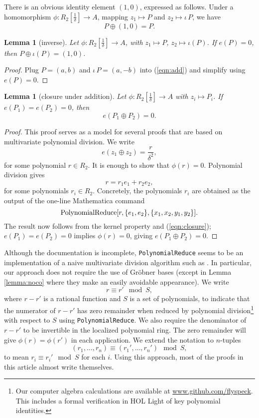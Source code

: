 \documentclass[12pt]{article}
\newtheorem{lemma}[theorem]{Lemma}
\newcommand{\op}[1]{\hbox{#1}}
\newcommand{\f}[1]{\frac{1}{#1}}
\begin{document}
There is an obvious identity element $(1,0)$, expressed as follows.
Under a homomorphism $\phi:R_2[\f{\delta}]\to A$, mapping $z_1\mapsto
P$ and $z_2\mapsto \iota\,P$, we have
\begin{equation}
P\oplus(1,0) = P.
\end{equation}

\begin{lemma} [inverse] 
  Let $\phi:R_2[\f{\delta}]\to A$, with $z_1\mapsto P$, $z_2\mapsto
  \iota(P)$.  If $e(P)=0$, then $P\oplus \iota(P) = (1,0)$.
\end{lemma}

\begin{proof} Plug $P=(a,b)$ and $\iota\,P=(a,-b)$ into
  (\ref{eqn:add}) and simplify using $e(P)=0$.
\end{proof}

\begin{lemma}[closure under addition]\label{lemma:closure}
  Let $\phi:R_2[\f{\delta}]\to A$ with $z_i\mapsto P_i$.  If
  $e(P_1)=e(P_2)=0$, then
  \[
  e(P_1 \oplus P_2) = 0.
  \]
\end{lemma}

\begin{proof} This proof serves as a model for several proofs that are
  based on multivariate polynomial division.  We write
\[
e(z_1\oplus z_2) = \frac{r}{\delta^2},
\]
for some polynomial $r \in R_2$.  It is enough to show that
$\phi(r)=0$.  Polynomial division gives
\begin{equation}\label{eqn:closure}
r= r_1 e_1 + r_2 e_2,
\end{equation}
for some polynomials $r_i\in R_2$.  Concretely, the polynomials $r_i$
are obtained as the output of the one-line Mathematica command
\[
\op{PolynomialReduce}[r,\{e_1,e_2\},\{x_1,x_2,y_1,y_2\}].
\]
The result now follows from the kernel property and
(\ref{eqn:closure}); $ e(P_1) = e(P_2) = 0$ implies $\phi(r)= 0$,
giving ${e}(P_1\oplus P_2)=0$.
\end{proof}

Although the documentation is incomplete, {\tt PolynomialReduce} seems
to be an implementation of a naive multivariate division algorithm
such as \cite{cox1992ideals}.  In particular, our approach does not
require the use of Gr\"obner bases (except in Lemma \ref{lemma:noco}
where they make an easily avoidable appearance).  We write
\[
r \equiv r' \mod S,
\]
where $r-r'$ is a rational function and $S$ is a set of polynomials,
to indicate that the numerator of $r-r'$ has zero remainder when
reduced by polynomial division\footnote{Our computer algebra
  calculations are available at \url{www.github.com/flyspeck}.  This
  includes a formal verification in HOL Light of key polynomial
  identities.} with respect to $S$ using {\tt PolynomialReduce}.  We
also require the denominator of $r-r'$ to be invertible in the
localized polynomial ring.  The zero remainder will give
$\phi(r)=\phi(r')$ in each application.  We extend the notation to
$n$-tuples
\[
(r_1,\ldots,r_n) \equiv (r_1',\ldots,r_n') \mod S,
\]
to mean $r_i \equiv r_i' \mod S$ for each $i$.  Using this approach,
most of the proofs in this article almost write themselves.
\end{document}
